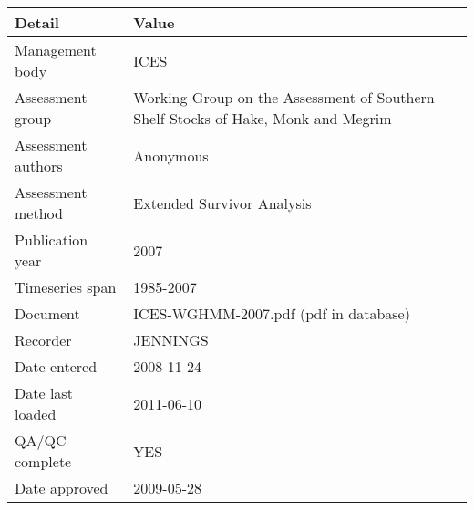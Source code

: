 \begin{table}[htb]
\centering
\begin{tabular}{lp{7cm}}
\toprule
Detail & Value \\
\midrule
Management body    & ICES                                                                              \\
Assessment group   & Working Group on the Assessment of Southern Shelf Stocks of Hake, Monk and Megrim \\
Assessment authors & Anonymous                                                                         \\
Assessment method  & Extended Survivor Analysis                                                        \\
Publication year   & 2007                                                                              \\
Timeseries span    & 1985-2007                                                                         \\
Document           & ICES-WGHMM-2007.pdf (pdf in database)                                             \\
Recorder           & JENNINGS                                                                          \\
Date entered       & 2008-11-24                                                                        \\
Date last loaded   & 2011-06-10                                                                        \\
QA/QC complete     & YES                                                                               \\
Date approved      & 2009-05-28                                                                        \\
\bottomrule
\end{tabular}
\label{tab:assessdet}
\end{table}
